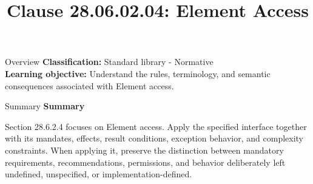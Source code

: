 \documentclass[10pt,letterpaper]{article}
\title{Clause 28.06.02.04: Element Access}
\author{}
\date{}
\begin{document}
\maketitle
\begin{CornellOverviewBox}{Overview}
\textbf{Classification:} Standard library - Normative\\[2pt]
\textbf{Learning objective:} Understand the rules, terminology, and semantic consequences associated with Element access.
\end{CornellOverviewBox}\begin{CornellSummaryBox}{Summary}
{\sffamily\bfseries\color{Accent} Summary}\par\vspace{3pt}Section 28.6.2.4 focuses on Element access. Apply the specified interface together with its mandates, effects, result conditions, exception behavior, and complexity constraints. When applying it, preserve the distinction between mandatory requirements, recommendations, permissions, and behavior deliberately left undefined, unspecified, or implementation-defined.
\end{CornellSummaryBox}
\end{document}
